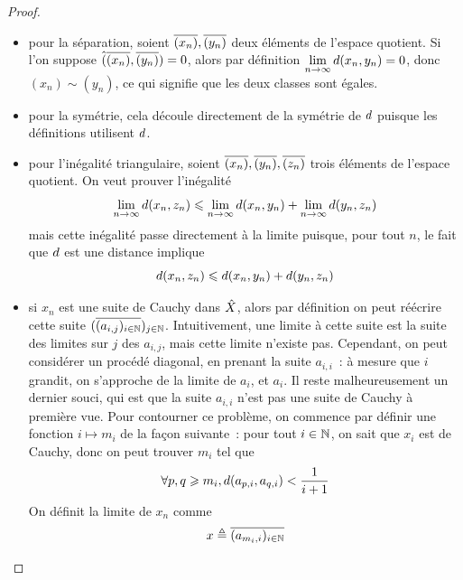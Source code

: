 \begin{proof}
\begin{itemize}
    $\vardis'((x_n),(z_n)) = \vardis'((y_n),(a_n))$, donc $\vardis'$ est
    constante sur les classes d'équivalence.
  \item pour la séparation, soient $\overline{(x_n)},\overline{(y_n)}$ deux
    éléments de l'espace quotient. Si l'on suppose
    $\hat{(}\overline{(x_n)},\overline{(y_n)}) = 0$,
    alors par définition $\displaystyle\lim_{n\to\infty} d(x_n,y_n) = 0$,
    donc $(x_n)\sim (y_n)$, ce qui signifie que les deux classes sont égales.
  \item pour la symétrie, cela découle directement de la symétrie de $d$
    puisque les définitions utilisent $d$.
  \item pour l'inégalité triangulaire, soient
    $\overline{(x_n)},\overline{(y_n)},\overline{(z_n)}$ trois éléments de
    l'espace quotient. On veut prouver l'inégalité
    \[\lim_{n\to\infty} d(x_n,z_n) \leqslant \lim_{n\to\infty} d(x_n,y_n) +
    \lim_{n\to\infty} d(y_n,z_n)\]
    mais cette inégalité passe directement à la limite puisque, pour tout $n$,
    le fait que $d$ est une distance implique
    \[d(x_n,z_n) \leqslant d(x_n,y_n) + d(y_n,z_n)\]
  \item si $x_n$ est une suite de Cauchy dans $\hat{X}$, alors par définition
    on peut réécrire cette suite
    $(\overline{(a_{i,j})_{i \in \mathbb N}})_{j \in \mathbb N}$. Intuitivement, une
    limite à cette suite est la suite des limites sur $j$ des $a_{i,j}$, mais
    cette limite n'existe pas. Cependant, on peut considérer un procédé
    diagonal, en prenant la suite $a_{i,i}$~: à mesure que $i$ grandit, on
    s'approche de la limite de $a_i$, et $a_i$. Il reste malheureusement un
    dernier souci, qui est que la suite $a_{i,i}$ n'est pas une suite de
    Cauchy à première vue. Pour contourner ce problème, on commence par
    définir une fonction $i \mapsto m_i$ de la façon suivante~: pour tout
    $i \in \mathbb N$, on sait que $x_i$ est de Cauchy, donc on peut trouver
    $m_i$ tel que
    \[\forall p,q \geqslant m_i, d(a_{p,i},a_{q,i}) < \frac{1}{i + 1}\]
    On définit la limite de $x_n$ comme
    \[x \triangleq \overline{(a_{m_i,i})_{i\in \mathbb N}}\]


\end{itemize}
\end{proof}
